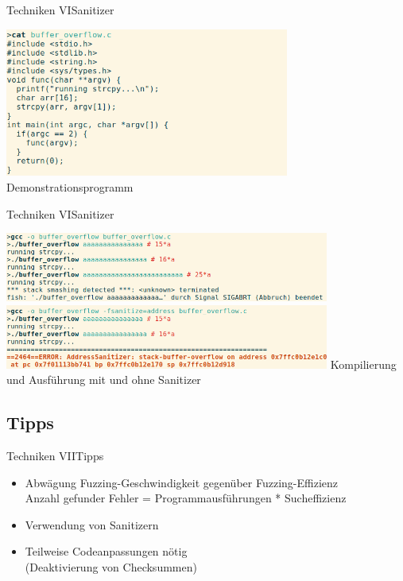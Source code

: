 \documentclass[ngerman,aspectratio=1610,12pt]{beamer}
\begin{document}
\begin{frame}{Techniken VI}{Sanitizer\\ }
  \begin{center}
    \includegraphics[width=0.7\textwidth]{images/buffer_overflow1}
    Demonstrationsprogramm
  \end{center}
\end{frame}

\begin{frame}{Techniken VI}{Sanitizer\\}
  \begin{center}
    \includegraphics[width=0.8\textwidth]{images/buffer_overflow2}\\
    \vspace{1.5em}
    \includegraphics[width=0.8\textwidth]{images/buffer_overflow3}
    Kompilierung und Ausführung mit und ohne Sanitizer
  \end{center}
\end{frame}




\subsection*{Tipps}
\begin{frame}{Techniken VII}{Tipps\\}
  \begin{itemize}

    \item Abwägung Fuzzing-Geschwindigkeit gegenüber Fuzzing-Effizienz \\ Anzahl gefunder Fehler = Programmausführungen * Sucheffizienz
    \item Verwendung von Sanitizern %
    \item Teilweise Codeanpassungen nötig \\ (Deaktivierung von Checksummen) 
  \end{itemize}
\end{frame}
\end{document}
